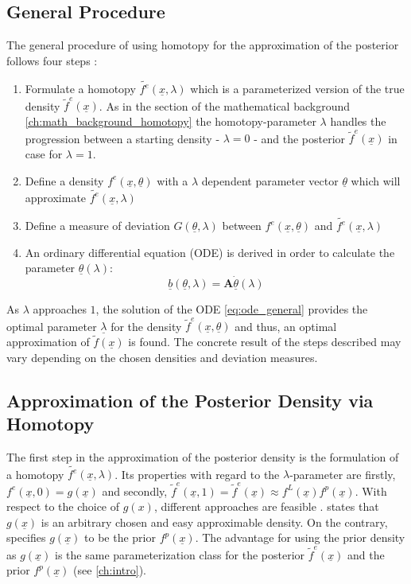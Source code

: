 \documentclass[a4paper]{IEEEtran}
\begin{document}
\subsection{General Procedure}
\label{ch:general_idea_homotopy}
The general procedure of using homotopy for the approximation of the posterior follows four steps \cite{hanebeck2003}:
\begin{enumerate}
    \item Formulate a homotopy $\tilde{f^e}(\underline{x},\lambda)$ which is a parameterized version of the true density $\tilde{f}^{e}(\underline{x})$. As in the section of the mathematical background \ref{ch:math_background_homotopy}
    the homotopy-parameter $\lambda$ handles the progression between a starting density - $\lambda = 0$ - and the posterior $\tilde{f}^e(\underline{x})$ in case for $\lambda = 1$.
    \item Define a density $f^e(\underline{x}, \underline{\theta})$ with a $\lambda$ dependent parameter vector $\underline{\theta}$ which will approximate $\tilde{f^e}(\underline{x},\lambda)$
    \item Define a measure of deviation $G(\underline{\theta}, \lambda)$ between $f^e(\underline{x}, \underline{\theta})$ and $\tilde{f^e}(\underline{x},\lambda)$
    \item An ordinary differential equation (ODE) is derived in order to calculate the parameter $\underline{\theta}(\lambda)$:
    \begin{equation}
        \underline{b}(\underline{\theta}, \lambda) = \textbf{A}\underline{\dot{\theta}}(\lambda)
        \label{eq:ode_general}
    \end{equation}
\end{enumerate}

As $\lambda$ approaches $1$, the solution of the ODE \eqref{eq:ode_general} provides the optimal parameter $\underline{\lambda}$ for the density $\tilde{f}^e(\underline{x}, \underline{\theta})$ and thus, an optimal approximation of $\tilde{f}(\underline{x})$ is found. The concrete result of the steps 
described may vary depending on the chosen densities and deviation measures.

\subsection{Approximation of the Posterior Density via Homotopy}
\label{ch:approx_posterior_homotopy}
 The first step in the approximation of the posterior density is the formulation of a homotopy $\tilde{f^e}(\underline{x},\lambda)$. 
 Its properties with regard to the $\lambda$-parameter are firstly,  $f^e(\underline{x}, 0) = g(\underline{x})$ and secondly, $\tilde{f}^e(\underline{x}, 1) = \tilde{f}^{e}(\underline{x}) \approx  f^{L}(\underline{x}) f^{p}(\underline{x})$.
 With respect to the choice of $g(x)$, different approaches are feasible . \cite{hanebeck2003} states that $g(\underline{x})$ is an arbitrary chosen and easy approximable density. On the contrary, \cite{hagmar2011} specifies $g(\underline{x})$ to be the prior
 $f^p(\underline{x})$. The advantage for using the prior density as $g(\underline{x})$ is the same parameterization class for the posterior $\tilde{f}^e(\underline{x})$ and the prior $f^p(\underline{x})$ (see \ref{ch:intro}).
\end{document}
